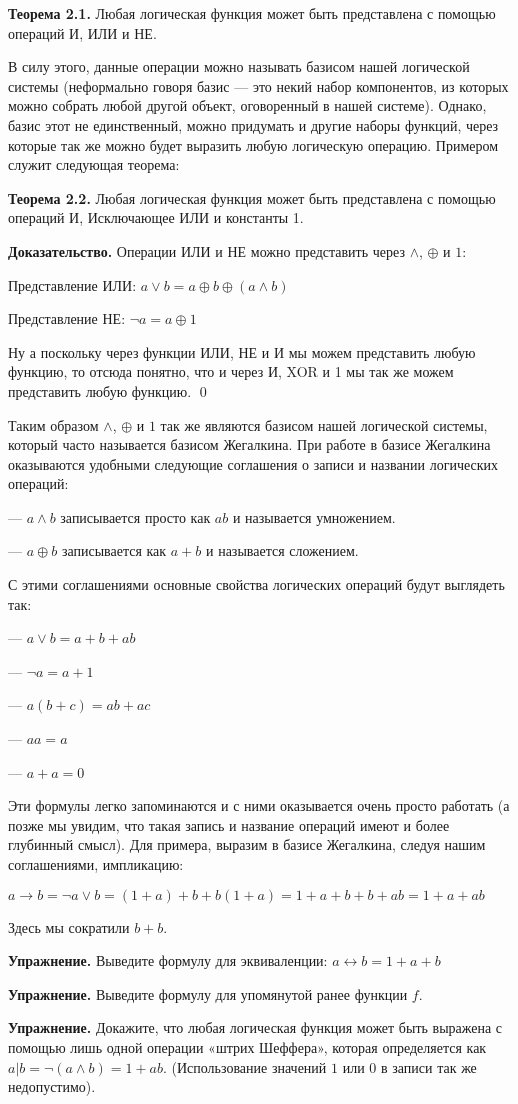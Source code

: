 {\bfseries Теорема 2.1.} Любая логическая функция может быть представлена с помощью операций И, ИЛИ и НЕ.

В силу этого, данные операции можно называть базисом нашей логической системы (неформально говоря базис — это некий набор компонентов, из которых можно собрать любой другой объект, оговоренный в нашей системе). Однако, базис этот не единственный, можно придумать и другие наборы функций, через которые так же можно будет выразить любую логическую операцию. Примером служит следующая теорема:

{\bfseries Теорема 2.2.} Любая логическая функция может быть представлена с помощью операций И, Исключающее ИЛИ и константы 1.

{\bfseries Доказательство.} Операции ИЛИ и НЕ можно представить через $\wedge$, $\oplus$ и $1$:

Представление ИЛИ: $a\vee b = a \oplus b \oplus (a\wedge b)$

Представление НЕ: $\neg a = a \oplus 1$

Ну а поскольку через функции ИЛИ, НЕ и И мы можем представить любую функцию, то отсюда понятно, что и через И, XOR и 1 мы так же можем представить любую функцию. \qed

Таким образом $\wedge$, $\oplus$ и $1$ так же являются базисом нашей логической системы, который часто называется базисом Жегалкина. При работе в базисе Жегалкина оказываются удобными следующие соглашения о записи и названии логических операций:

— $a\wedge b$ записывается просто как $ab$ и называется умножением.

— $a \oplus b$ записывается как $a + b$ и называется сложением.

С этими соглашениями основные свойства логических операций будут выглядеть так:

— $a\vee b=a + b +ab$

— $\neg a = a + 1$

— $a(b+c) = ab + ac$

— $aa = a$

— $a + a = 0$

Эти формулы легко запоминаются и с ними оказывается очень просто работать (а позже мы увидим, что такая запись и название операций имеют и более глубинный смысл). Для примера, выразим в базисе Жегалкина, следуя нашим соглашениями, импликацию:

$a \rightarrow b = \neg a \vee b = (1 + a) + b + b(1 + a) = 1 + a + b + b + ab = 1 + a + ab$

Здесь мы сократили $b+b$.

{\bfseries Упражнение.} Выведите формулу для эквиваленции: $a \leftrightarrow b = 1 + a + b$

{\bfseries Упражнение.} Выведите формулу для упомянутой ранее функции $f$.

{\bfseries Упражнение.} Докажите, что любая логическая функция может быть выражена с помощью лишь одной операции «штрих Шеффера», которая определяется как $a|b = \neg(a\wedge b) = 1 + ab$. (Использование значений $1$ или $0$ в записи так же недопустимо).
